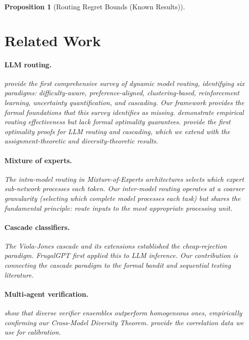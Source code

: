 \documentclass[11pt, a4paper, logo, copyright]{googledeepmind}
\newtheorem{proposition}{Proposition}[section]
\begin{document}
\begin{proposition}[Routing Regret Bounds (Known Results)]
\section{Related Work}
\label{sec:related}

\paragraph{LLM routing.} \citet{moslemsurvey2026} provide the first comprehensive survey of dynamic model routing, identifying six paradigms: difficulty-aware, preference-aligned, clustering-based, reinforcement learning, uncertainty quantification, and cascading. Our framework provides the formal foundations that this survey identifies as missing. \citet{routellm2025} demonstrate empirical routing effectiveness but lack formal optimality guarantees. \citet{dekoninck2025cascade} provide the first optimality proofs for LLM routing and cascading, which we extend with the assignment-theoretic and diversity-theoretic results.

\paragraph{Mixture of experts.} The intra-model routing in Mixture-of-Experts architectures \citep{shazeer2017moe, fedus2022switch} selects which expert sub-network processes each token. Our inter-model routing operates at a coarser granularity (selecting which complete model processes each task) but shares the fundamental principle: route inputs to the most appropriate processing unit.

\paragraph{Cascade classifiers.} The Viola-Jones cascade \citep{violajones2001, violajones2004} and its extensions \citep{saberian2014} established the cheap-rejection paradigm. FrugalGPT \citep{frugalgpt2023} first applied this to LLM inference. Our contribution is connecting the cascade paradigm to the formal bandit and sequential testing literature.

\paragraph{Multi-agent verification.} \citet{lifshitz2025multiagent} show that diverse verifier ensembles outperform homogeneous ones, empirically confirming our Cross-Model Diversity Theorem. \citet{correlatedllm2025} provide the correlation data we use for calibration.


\end{proposition}
\end{document}
